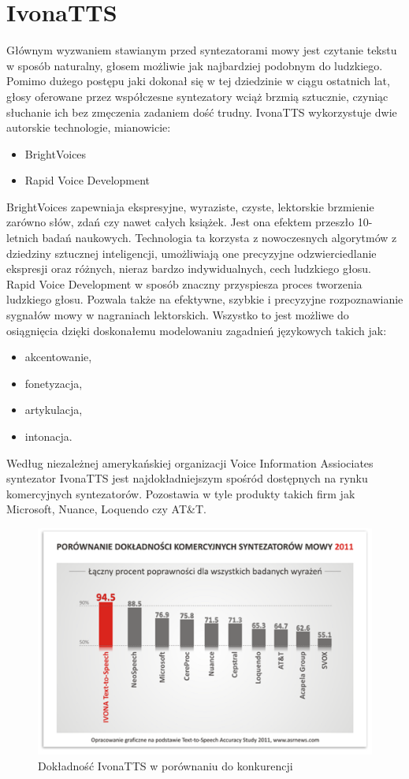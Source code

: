 \section{IvonaTTS}
Głównym wyzwaniem stawianym przed syntezatorami mowy jest czytanie tekstu w sposób naturalny, głosem możliwie jak najbardziej podobnym do ludzkiego. Pomimo dużego postępu jaki dokonał się w tej dziedzinie w ciągu ostatnich lat, głosy oferowane przez współczesne syntezatory wciąż brzmią sztucznie, czyniąc słuchanie ich bez zmęczenia zadaniem dość trudny. IvonaTTS wykorzystuje dwie autorskie technologie, mianowicie:
\begin{itemize}
	\item BrightVoices
	\item Rapid Voice Development
\end{itemize} 
BrightVoices zapewniaja ekspresyjne, wyraziste, czyste, lektorskie brzmienie zarówno słów, zdań czy nawet całych książek. Jest ona efektem przeszło 10-letnich badań naukowych. Technologia ta korzysta z nowoczesnych algorytmów z dziedziny sztucznej inteligencji, umożliwiają one precyzyjne odzwierciedlanie ekspresji oraz różnych, nieraz bardzo indywidualnych, cech ludzkiego głosu.   \\
Rapid Voice Development w sposób znaczny przyspiesza proces tworzenia ludzkiego głosu. Pozwala także na efektywne, szybkie i precyzyjne rozpoznawianie sygnałów mowy w nagraniach lektorskich. Wszystko to jest możliwe do osiągnięcia dzięki doskonałemu modelowaniu zagadnień językowych takich jak:
\begin{itemize}
	\item akcentowanie,
	\item fonetyzacja,
	\item artykulacja,
	\item intonacja.
\end{itemize}
Według niezależnej amerykańskiej organizacji Voice Information Assiociates syntezator IvonaTTS jest najdokładniejszym spośród dostępnych na rynku komercyjnych syntezatorów. Pozostawia w tyle produkty takich firm jak Microsoft, Nuance, Loquendo czy AT\&T.
\begin{figure}[!h]
	\centering
	\includegraphics[scale=0.45]{IvonaWydajnosc.png} 
	\caption{Dokładność IvonaTTS w porównaniu do konkurencji}
\end{figure}

